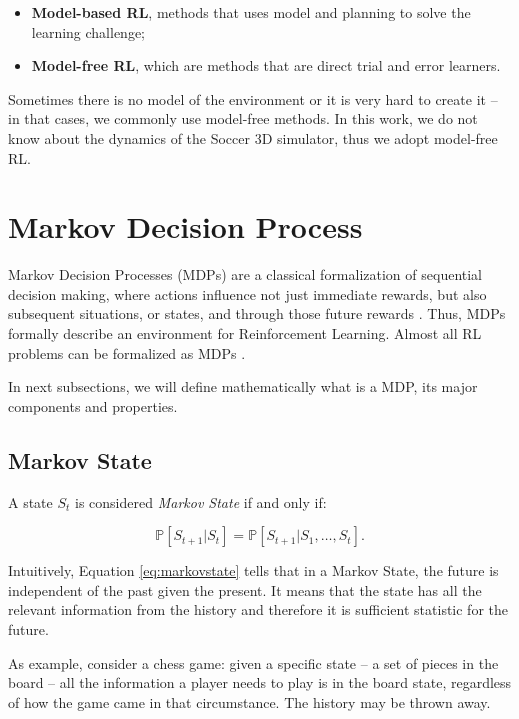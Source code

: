 \begin{itemize}
	\item \textbf{Model-based RL}, methods that uses model and planning to solve the learning challenge;
	\item \textbf{Model-free RL}, which are methods that are direct trial and error learners.
\end{itemize}

Sometimes there is no model of the environment or it is very hard to create it -- in that cases, we commonly use model-free methods. In this work, we do not know about the dynamics of the Soccer 3D simulator, thus we adopt model-free RL.

\section{Markov Decision Process}

 Markov Decision Processes (MDPs) are a classical
formalization of sequential decision making, where actions influence not just immediate rewards, but also
subsequent situations, or states, and through those future rewards \cite{sutton1998rli}. Thus, MDPs formally describe an environment for Reinforcement Learning. Almost all RL problems can be formalized as MDPs \cite{davidsilverlec2}.

In next subsections, we will define mathematically what is a MDP, its major components and properties.

\subsection{Markov State}\label{sec:markovstate}

A state $S_{t}$ is considered \textit{Markov State} if and only if:

\begin{equation}\label{eq:markovstate}
	\mathbb{P}[S_{t+1} | S_{t}] = \mathbb{P}[S_{t+1} | S_{1},\dots, S_{t}].
\end{equation}

Intuitively, Equation \ref{eq:markovstate} tells that in a Markov State, the future is independent of the past given the present. It means that the state has all the relevant information from the history and therefore it is sufficient statistic for the future. 

As example, consider a chess game: given a specific state -- a set of pieces in the board -- all the information a player needs to play is in the board state, regardless of how the game came in that circumstance. The history may be thrown away.

